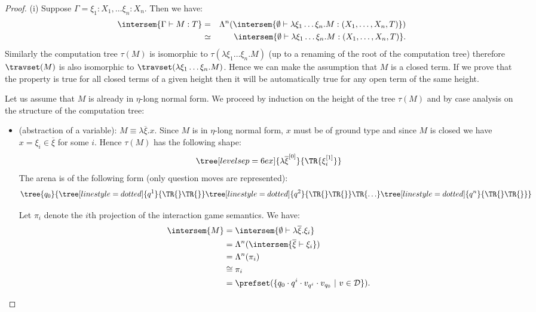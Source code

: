 \begin{proof}
(i) Suppose $\Gamma = \xi_1:X_1,\ldots \xi_n:X_n$. Then we have:
\begin{eqnarray*}
\intersem{\Gamma \vdash M:T} &=& \Lambda^n( \intersem{\emptyset \vdash \lambda \xi_1\ldots \xi_n . M: (X_1,\ldots,X_n,T) } ) \\
        &\simeq& \intersem{\emptyset \vdash \lambda \xi_1\ldots \xi_n . M: (X_1,\ldots,X_n,T) }.
\end{eqnarray*}
Similarly the computation tree $\tau(M)$ is isomorphic to
$\tau(\lambda \xi_1\ldots \xi_n . M)$ (up to a renaming of the root
of the computation tree) therefore $\travset(M)$ is also isomorphic
to $\travset(\lambda \xi_1\ldots \xi_n . M)$. Hence we can make the
assumption that $M$ is a closed term. If we prove that the property
is true for all closed terms of a given height then it will be
automatically true for any open term of the same height.


Let us assume that $M$ is already in $\eta$-long normal form. We
proceed by induction on the height of the tree $\tau(M)$ and by
case analysis on the structure of the computation tree:
\begin{itemize}
  \item (abstraction of a variable): $M \equiv \lambda \overline{\xi} .
  x$.  Since $M$ is in $\eta$-long normal form, $x$ must be of ground type and since $M$ is
      closed we have $x = \xi_i \in \overline{\xi}$ for some $i$.
      Hence $\tau(M)$ has the following shape:
        $$ \tree[levelsep=6ex]{ \lambda \overline{\xi}^{[0]} }{\TR{\xi_i^{[1]}}}$$
        The arena is of the following form (only question moves are represented):
        $$ \tree{ q_0 }
        {   \tree[linestyle=dotted]{q^1}{\TR{} \TR{} }
            \tree[linestyle=dotted]{q^2}{\TR{} \TR{} }
            \TR{\ldots}
            \tree[linestyle=dotted]{q^n}{\TR{} \TR{} }
        }$$

        Let $\pi_i$ denote the $i$th projection of the interaction game
        semantics. We have:
        \begin{align*}
        \intersem{M} &= \intersem{\emptyset \vdash \lambda \overline{\xi} . \xi_i} \\
                     &= \Lambda^n(\intersem{\overline{\xi} \vdash  \xi_i}) \\
                     &= \Lambda^n(\pi_i) \\
                     &\cong \pi_i \\
                     &= \prefset(\{ q_0 \cdot q^i \cdot v_{q^i} \cdot v_{q_0} \ | \ v\in \mathcal{D}
                     \}).
        \end{align*}


\end{itemize}
\end{proof}
